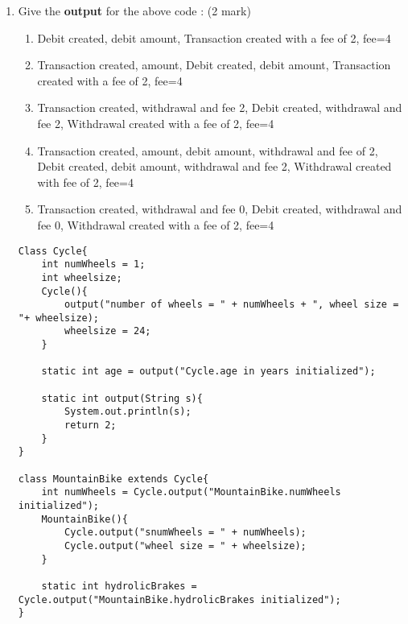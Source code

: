 \documentclass{article}
\begin{document}
\begin{enumerate}[resume]
	\item Give the \textbf{output} for the above code : (2 mark)
	\begin{enumerate}
		\item Debit created, debit amount, Transaction created with a fee of 2, fee=4
		\item Transaction created, amount, Debit created, debit amount, Transaction created with a fee of 2, fee=4
		\item Transaction created, withdrawal and fee 2, Debit created, withdrawal and fee 2, Withdrawal created with a fee of 2, fee=4
		\item Transaction created, amount, debit amount, withdrawal and fee of 2, Debit created, debit amount, withdrawal and fee 2, Withdrawal created with fee of 2, fee=4
		\item Transaction created, withdrawal and fee 0, Debit created, withdrawal and fee 0, Withdrawal created with a fee of 2, fee=4
	\end{enumerate}
	\begin{lstlisting}
Class Cycle{
	int numWheels = 1;
	int wheelsize;
	Cycle(){
		output("number of wheels = " + numWheels + ", wheel size = "+ wheelsize);
		wheelsize = 24;
	}
	
	static int age = output("Cycle.age in years initialized");
	
	static int output(String s){
		System.out.println(s);
		return 2;
	}
}

class MountainBike extends Cycle{
	int numWheels = Cycle.output("MountainBike.numWheels initialized");
	MountainBike(){
		Cycle.output("snumWheels = " + numWheels);
		Cycle.output("wheel size = " + wheelsize);
	}
	
	static int hydrolicBrakes = Cycle.output("MountainBike.hydrolicBrakes initialized");
}


\end{lstlisting}
\end{enumerate}
\end{document}
